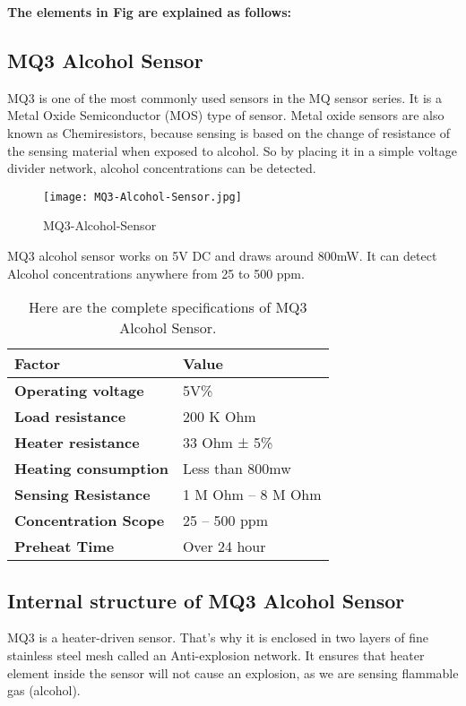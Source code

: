 \textbf{	The elements in Fig  are explained as follows:}

\subsection{MQ3 Alcohol Sensor}
MQ3 is one of the most commonly used sensors in the MQ sensor series. It is a Metal Oxide Semiconductor (MOS) type of sensor. Metal oxide sensors are also known as Chemiresistors, because sensing is based on the change of resistance of the sensing material when exposed to alcohol. So by placing it in a simple voltage divider network, alcohol concentrations can be detected.
\vspace{.5cm}

\begin{figure}[h]
	\centering
	\texttt{[image: MQ3-Alcohol-Sensor.jpg]}
	\caption{MQ3-Alcohol-Sensor}
\end{figure}

MQ3 alcohol sensor works on 5V DC and draws around 800mW. It can detect Alcohol concentrations anywhere from 25 to 500 ppm.

\begin{table}[h]
	\begin{center}
		
		\begin{tabular}{l|l} 
			\textbf{Factor} & \textbf{Value} \\
			\hline
			\textbf{Operating voltage} & 5V\%\\
			\textbf{Load resistance}	& 200 K Ohm\\
			\textbf{Heater resistance} &	33 Ohm ± 5\%\\
			\textbf{Heating consumption}	& Less than 800mw\\
			\textbf{Sensing Resistance}	& 1 M Ohm – 8 M Ohm\\
			\textbf{Concentration Scope}	& 25 – 500 ppm\\
			\textbf{Preheat Time}	& Over 24 hour
			
		\end{tabular}\caption{Here are the complete specifications of MQ3 Alcohol Sensor.}
	\end{center}
\end{table}

\subsection{Internal structure of MQ3 Alcohol Sensor}
MQ3 is a heater-driven sensor. That’s why it is enclosed in two layers of fine stainless steel mesh called an Anti-explosion network. It ensures that heater element inside the sensor will not cause an explosion, as we are sensing flammable gas (alcohol).

